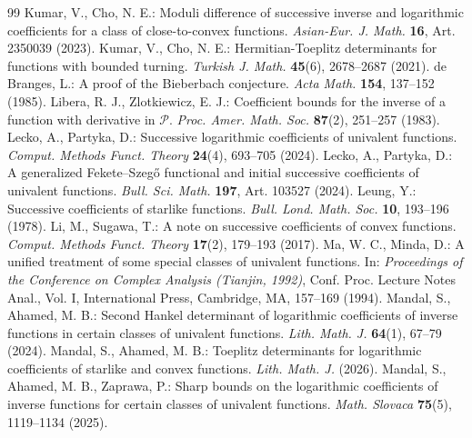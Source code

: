 \documentclass[10pt,a4paper]{amsart}
\numberwithin{equation}{section}
\begin{document}
\begin{thebibliography}{99}
 Kumar, V., Cho, N. E.: Moduli difference of successive inverse and logarithmic coefficients for a class of close-to-convex functions. \textit{Asian-Eur. J. Math.} \textbf{16}, Art. 2350039 (2023).
 Kumar, V., Cho, N. E.: Hermitian-Toeplitz determinants for functions with bounded turning. \textit{Turkish J. Math.} \textbf{45}(6), 2678--2687 (2021).
 de Branges, L.: A proof of the Bieberbach conjecture. \textit{Acta Math.} \textbf{154}, 137--152 (1985).
 Libera, R. J., Zlotkiewicz, E. J.: Coefficient bounds for the inverse of a function with derivative in $\mathcal{P}$. \textit{Proc. Amer. Math. Soc.} \textbf{87}(2), 251--257 (1983).
 Lecko, A., Partyka, D.: Successive logarithmic coefficients of univalent functions. \textit{Comput. Methods Funct. Theory} \textbf{24}(4), 693--705 (2024).
 Lecko, A., Partyka, D.: A generalized Fekete--Szeg\H{o} functional and initial successive coefficients of univalent functions. \textit{Bull. Sci. Math.} \textbf{197}, Art. 103527 (2024).
 Leung, Y.: Successive coefficients of starlike functions. \textit{Bull. Lond. Math. Soc.} \textbf{10}, 193--196 (1978).
 Li, M., Sugawa, T.: A note on successive coefficients of convex functions. \textit{Comput. Methods Funct. Theory} \textbf{17}(2), 179--193 (2017).
 Ma, W. C., Minda, D.: A unified treatment of some special classes of univalent functions. In: \textit{Proceedings of the Conference on Complex Analysis (Tianjin, 1992)}, Conf. Proc. Lecture Notes Anal., Vol. I, International Press, Cambridge, MA, 157--169 (1994).
 Mandal, S., Ahamed, M. B.: Second Hankel determinant of logarithmic coefficients of inverse functions in certain classes of univalent functions. \textit{Lith. Math. J.} \textbf{64}(1), 67--79 (2024). %
 Mandal, S., Ahamed, M. B.: Toeplitz determinants for logarithmic coefficients of starlike and convex functions. \textit{Lith. Math. J.} (2026). %
 Mandal, S., Ahamed, M. B., Zaprawa, P.: Sharp bounds on the logarithmic coefficients of inverse functions for certain classes of univalent functions. \textit{Math. Slovaca} \textbf{75}(5), 1119--1134 (2025).

\end{thebibliography}
\end{document}
